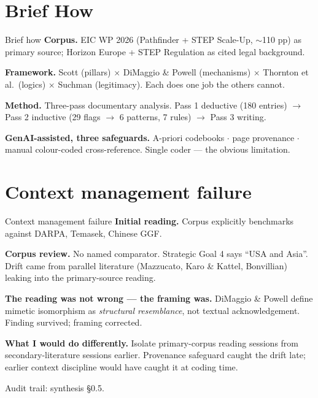 \documentclass[aspectratio=169,hyperref={pdfpagelabels=false}]{beamer}
\begin{document}
\section{Brief How}

\begin{frame}{Brief how}
    \textbf{Corpus.} EIC WP 2026 (Pathfinder + STEP Scale-Up, $\sim$110 pp) as primary source; Horizon Europe + STEP Regulation as cited legal background.

    \vspace{3mm}
    \textbf{Framework.} Scott (pillars) $\times$ DiMaggio \& Powell (mechanisms) $\times$ Thornton et al.\ (logics) $\times$ Suchman (legitimacy). Each does one job the others cannot.

    \vspace{3mm}
    \textbf{Method.} Three-pass documentary analysis. Pass 1 deductive (180 entries) $\to$ Pass 2 inductive (29 flags $\to$ 6 patterns, 7 rules) $\to$ Pass 3 writing.

    \vspace{2mm}
    \textbf{GenAI-assisted, three safeguards.} A-priori codebooks $\cdot$ page provenance $\cdot$ manual colour-coded cross-reference. Single coder — the obvious limitation.
\end{frame}

\section{Context management failure}

\begin{frame}{Context management failure}
    \textbf{Initial reading.} Corpus explicitly benchmarks against DARPA, Temasek, Chinese GGF.

    \vspace{2mm}
    \textbf{Corpus review.} No named comparator. Strategic Goal 4 says \enquote{USA and Asia}. Drift came from parallel literature (Mazzucato, Karo \& Kattel, Bonvillian) leaking into the primary-source reading.

    \vspace{3mm}
    \textbf{The reading was not wrong — the framing was.} DiMaggio \& Powell define mimetic isomorphism as \emph{structural resemblance}, not textual acknowledgement. Finding survived; framing corrected.

    \vspace{3mm}
    \textbf{What I would do differently.} Isolate primary-corpus reading sessions from secondary-literature sessions earlier. Provenance safeguard caught the drift late; earlier context discipline would have caught it at coding time.

    \vspace{2mm}
    \footnotesize Audit trail: synthesis §0.5.
\end{frame}
\end{document}
